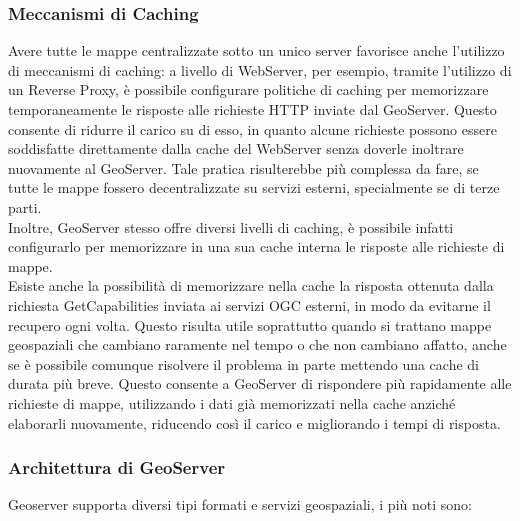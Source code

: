 \subsubsection{Meccanismi di Caching}

Avere tutte le mappe centralizzate sotto un unico server favorisce anche l'utilizzo di meccanismi di caching:
a livello di WebServer, per esempio, tramite l'utilizzo di un Reverse Proxy, è possibile configurare politiche di caching per memorizzare temporaneamente le risposte alle richieste HTTP inviate dal GeoServer. Questo consente di ridurre il carico su di esso, in quanto alcune richieste possono essere soddisfatte direttamente dalla cache del WebServer senza doverle inoltrare nuovamente al GeoServer. Tale pratica risulterebbe più complessa da fare, se tutte le mappe fossero decentralizzate su servizi esterni, specialmente se di terze parti.
\\Inoltre, GeoServer stesso offre diversi livelli di caching, è possibile infatti configurarlo per memorizzare in una sua cache interna le risposte alle richieste di mappe.
\\Esiste anche la possibilità di memorizzare nella cache la risposta ottenuta dalla richiesta GetCapabilities inviata ai servizi OGC esterni, in modo da evitarne il recupero ogni volta. Questo risulta utile soprattutto quando si trattano mappe geospaziali che cambiano raramente nel tempo o che non cambiano affatto, anche se è possibile comunque risolvere il problema in parte mettendo una cache di durata più breve.
Questo consente a GeoServer di rispondere più rapidamente alle richieste di mappe, utilizzando i dati già memorizzati nella cache anziché elaborarli nuovamente, riducendo così il carico e migliorando i tempi di risposta.

\subsubsection{Architettura di GeoServer}

Geoserver supporta diversi tipi formati e servizi geospaziali, i più noti sono:

